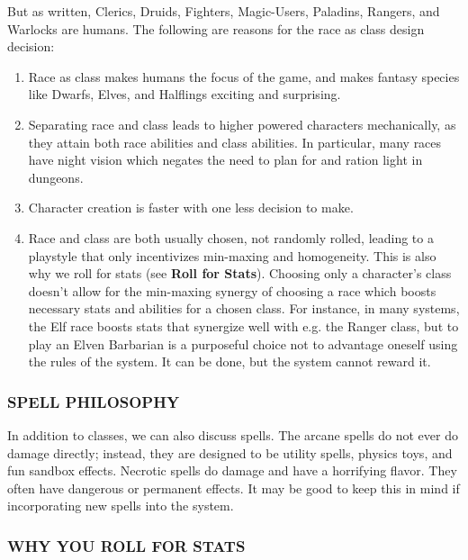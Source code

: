 \documentclass[twoside]{article}
\begin{document}
\bigbreak

But as written, Clerics, Druids, Fighters, Magic-Users, Paladins, Rangers, and Warlocks are humans. The following are reasons for the race as class design decision:

\bigbreak

\begin{enumerate}[nosep]
\item Race as class makes humans the focus of the game, and makes fantasy species like Dwarfs, Elves, and Halflings exciting and surprising.
\item Separating race and class leads to higher powered characters mechanically, as they attain both race abilities and class abilities. In particular, many races have night vision which negates the need to plan for and ration light in dungeons.
\item Character creation is faster with one less decision to make.
\item Race and class are both usually chosen, not randomly rolled, leading to a playstyle that only incentivizes min-maxing and homogeneity. This is also why we roll for stats (see \textbf{Roll for Stats}). Choosing only a character's class doesn't allow for the min-maxing synergy of choosing a race which boosts necessary stats and abilities for a chosen class. For instance, in many systems, the Elf race boosts stats that synergize well with e.g. the Ranger class, but to play an Elven Barbarian is a purposeful choice not to advantage oneself using the rules of the system. It can be done, but the system cannot reward it.
\end{enumerate}

\subsubsection*{\footnotesize{S}\scriptsize{PELL PHILOSOPHY}\normalsize}

In addition to classes, we can also discuss spells. The arcane spells do not ever do damage directly; instead, they are designed to be utility spells, physics toys, and fun sandbox effects. Necrotic spells do damage and have a horrifying flavor. They often have dangerous or permanent effects. It may be good to keep this in mind if incorporating new spells into the system.

\subsubsection*{\footnotesize{W}\scriptsize{HY YOU ROLL FOR STATS}\normalsize}
\end{document}
